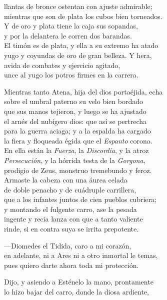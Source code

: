 llantas de bronce ostentan con ajuste admirable;\\
mientras que son de plata los cubos bien torneados.\\
Y de oro y plata tiene la caja sus sopandas,\\
y por la delantera le corren dos barandas.\\
El timón es de plata, y ella a su extremo ha atado\\
yugo y coyundas de oro de gran belleza. Y hera,\\
avida de combates y ejercicio agitado,\\
unce al yugo los potros firmes en la carrera.\par
Mientras tanto Atena, hija del dios portaéjida, echa\\
sobre el umbral paterno su velo bien bordado\\
que sus manos tejieron, y luego se ha ajustado\\
el arnés del nubígero dios: que así se pertrecha\\
para la guerra aciaga; y a la espalda ha cargado\\
la fiera y floqueada égida que el \emph{Espanto} corona.\\
En ella están la \emph{Fuerza}, la \emph{Discordia}, y la atroz\\
\emph{Persecución}, y la hórrida testa de la \emph{Gorgona},\\
prodigio de Zeus, monstruo tremebundo y feroz.\\
Armaste la cabeza con una áurea celada\\
de doble penacho y de cuádruple carrillera,\\
que a los infantes juntos de cien pueblos cubriera;\\
y montando el fulgente carro, ase la pesada\\
ingente y recia lanza con que a tanto valiente\\
rinde, si en contra suya se irrita prepotente.\par
\poend
\separator
%
\postart
{}
---Diomedes el Tidida, caro a mi corazón,\\
en adelante, ni a Ares ni a otro inmortal le temas,\\
pues quiero darte ahora toda mi protección.\par
\poend
\separator
%
\postart
{}
Dijo, y asiendo a Esténelo la mano, prontamente\\
lo hizo bajar del carro, donde la diosa ardiente,\\
